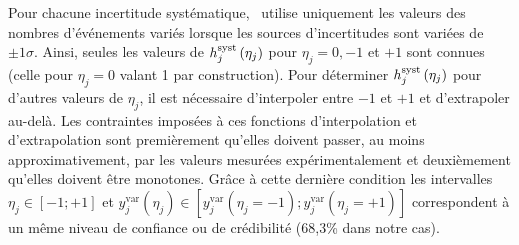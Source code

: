
Pour chacune incertitude syst\'ematique, \opthylic~utilise uniquement les valeurs des nombres d'\'ev\'enements vari\'es lorsque les sources d'incertitudes sont vari\'ees de $\pm 1\sigma$. 
Ainsi, seules les valeurs de $\fsyst_j\left(\eta_j\right)$ pour $\eta_j=0, -1$ et $+1$ sont connues (celle pour $\eta_j=0$ valant 1 par construction).
Pour d\'eterminer $\fsyst_j\left(\eta_j\right)$ pour d'autres valeurs de $\eta_j$, il est n\'ecessaire d'interpoler entre $-1$ et $+1$ et d'extrapoler au-del\`a. Les contraintes imposées \`a ces fonctions d'interpolation et d'extrapolation sont premi\`erement qu'elles doivent passer, au moins approximativement, par les valeurs mesurées expérimentalement et deuxièmement qu'elles doivent être monotones. Gr\^ace \`a cette derni\`ere condition les intervalles $\eta_j\in\left[-1;+1\right]$ et $y^\text{var}_j\left(\eta_j\right)\in\left[y^\text{var}_j\left(\eta_j=-1\right);y^\text{var}_j\left(\eta_j=+1\right)\right]$ correspondent \`a un m\^eme niveau de confiance ou de crédibilité (68,3\% dans notre cas). 


